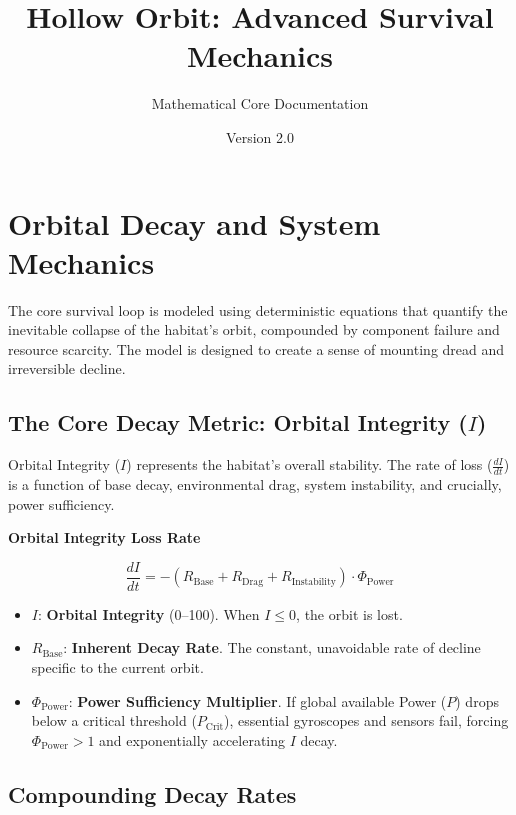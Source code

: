 \documentclass{article}
\title{\color{DeepVoid}\textbf{Hollow Orbit: Advanced Survival Mechanics}}
\author{\large Mathematical Core Documentation}
\date{Version 2.0}
\newenvironment{mathbox}[1][\unskip]{
    \begin{tcolorbox}
    \textbf{#1}
}{
    \end{tcolorbox}
}
\begin{document}
\maketitle
\thispagestyle{empty} %

\section*{Orbital Decay and System Mechanics}

The core survival loop is modeled using deterministic equations that quantify the inevitable collapse of the habitat's orbit, compounded by component failure and resource scarcity. The model is designed to create a sense of mounting dread and irreversible decline.

\subsection{The Core Decay Metric: Orbital Integrity ($I$)}\hspace{0.5em}

Orbital Integrity ($I$) represents the habitat's overall stability. The rate of loss ($\frac{dI}{dt}$) is a function of base decay, environmental drag, system instability, and crucially, power sufficiency.

\begin{mathbox}[\color{DeepVoid}Orbital Integrity Loss Rate]
$$
\frac{dI}{dt} = - (R_{\text{Base}} + R_{\text{Drag}} + R_{\text{Instability}}) \cdot \Phi_{\text{Power}}
$$
\end{mathbox}

\begin{itemize}
    \item $I$: \textbf{Orbital Integrity} (0--100). When $I \le 0$, the orbit is lost.
    \item $R_{\text{Base}}$: \textbf{Inherent Decay Rate}. The constant, unavoidable rate of decline specific to the current orbit.
    \item $\Phi_{\text{Power}}$: \textbf{Power Sufficiency Multiplier}. If global available Power ($P$) drops below a critical threshold ($P_{\text{Crit}}$), essential gyroscopes and sensors fail, forcing $\Phi_{\text{Power}} > 1$ and exponentially accelerating $I$ decay.
\end{itemize}

\vspace{1em}
\subsection{Compounding Decay Rates}\hspace{0.5em}
\end{document}
